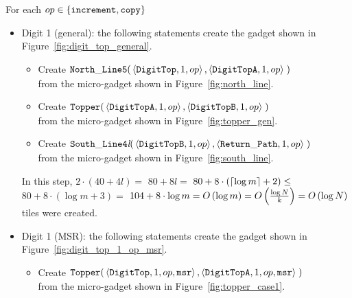     For each $\inc \in \{ {\tt increment, copy } \}$
    \begin{itemize}

        \item Digit 1 (general): the following statements create the gadget shown in Figure~\ref{fig:digit_top_general}.
        \begin{itemize}
            \item Create
            $\begin{aligned}[t]
                {\tt North\_Line5}(& \left \langle {\tt DigitTop},  1, \inc \right\rangle,
                                     \left \langle {\tt DigitTopA}, 1, \inc \right\rangle \;)
            \end{aligned}$\\from the micro-gadget shown in Figure~\ref{fig:north_line}.

            \item Create
            $\begin{aligned}[t]
                {\tt Topper}(& \left \langle {\tt DigitTopA}, 1, \inc \right\rangle,
                               \left \langle {\tt DigitTopB}, 1, \inc \right\rangle \;)
            \end{aligned}$\\from the micro-gadget shown in Figure~\ref{fig:topper_gen}.

            \item Create
            $\begin{aligned}[t]
                {\tt South\_Line4\textit{l}}(& \left\langle {\tt DigitTopB}, 1, \inc \right\rangle,
                                               \left\langle \returnpath,     1, \inc \right\rangle \;)
            \end{aligned}$\\from the micro-gadget shown in Figure~\ref{fig:south_line}.
        \end{itemize}
        In this step, $2 \cdot \left( 40 + 4l \right) =$
        $80 + 8l =$
        $80 + 8 \cdot \left( \ceil*{\log m} + 2 \right) \leq$
        $80 + 8 \cdot \left( {\log m} + 3 \right) =$
        $104 + 8 \cdot {\log m} = \bigologm$ tiles were created.
        \vspace{0.5cm}


        \item Digit 1 (MSR): the following statements create the gadget shown in Figure~\ref{fig:digit_top_1_op_msr}.
        \begin{itemize}
            \item Create
            $\begin{aligned}[t]
                {\tt Topper}(& \left\langle {\tt DigitTop},  1, \inc, {\tt msr} \right\rangle,
                               \left\langle {\tt DigitTopA}, 1, \inc, {\tt msr} \right\rangle \;)
            \end{aligned}$ \\ from the micro-gadget shown in Figure~\ref{fig:topper_case1}.



\end{itemize}
\end{itemize}
